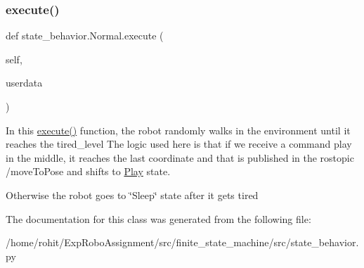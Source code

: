 \subsubsection{\texorpdfstring{execute()}{execute()}}
{\footnotesize\ttfamily def state\+\_\+behavior.\+Normal.\+execute (\begin{DoxyParamCaption}\item[{}]{self,  }\item[{}]{userdata }\end{DoxyParamCaption})}



In this \hyperlink{classstate__behavior_1_1Normal_ad34ac585f5ba450b5e2921bb69132f4d}{execute()} function, the robot randomly walks in the environment until it reaches the tired\+\_\+level The logic used here is that if we receive a command play in the middle, it reaches the last coordinate and that is published in the rostopic /move\+To\+Pose and shifts to \hyperlink{classstate__behavior_1_1Play}{Play} state. 

Otherwise the robot goes to \char`\"{}\+Sleep\char`\"{} state after it gets tired 

The documentation for this class was generated from the following file\+:\begin{DoxyCompactItemize}
\item 
/home/rohit/\+Exp\+Robo\+Assignment/src/finite\+\_\+state\+\_\+machine/src/state\+\_\+behavior.\+py\end{DoxyCompactItemize}
